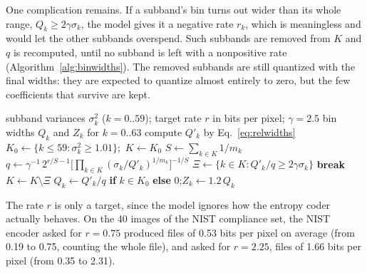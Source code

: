 One complication remains. If a subband's bin turns out wider than its whole range,
$Q_k \ge 2\gamma\sigma_k$, the model gives it a negative rate $r_k$, which is meaningless and
would let the other subbands overspend. Such subbands are removed from $K$ and $q$ is
recomputed, until no subband is left with a nonpositive rate (Algorithm~\ref{alg:binwidths}).
The removed subbands are still quantized with the final widths: they are expected to quantize
almost entirely to zero, but the few coefficients that survive are kept.

\begin{algorithm}[ht]
  \caption{Bin widths of encoder number two (Part 3, Section 3.2).}
  \label{alg:binwidths}
  \begin{algorithmic}[1]
    \Require subband variances $\sigma_k^2$ ($k = 0..59$); target rate $r$ in bits per pixel; $\gamma = 2.5$
    \Ensure bin widths $Q_k$ and $Z_k$ for $k = 0..63$
    \State compute $Q'_k$ by Eq.~\eqref{eq:relwidths}
    \State $K_0 \gets \{k \le 59 : \sigma_k^2 \ge 1.01\}$;\ $K \gets K_0$
    \Loop
      \State $S \gets \sum_{k\in K} 1/m_k$
      \State $q \gets \gamma^{-1}\, 2^{r/S - 1} \bigl[\prod_{k\in K} (\sigma_k/Q'_k)^{1/m_k}\bigr]^{-1/S}$
      \State $\Xi \gets \{k \in K : Q'_k/q \ge 2\gamma\sigma_k\}$ 
      \If{$\Xi = \emptyset$} \textbf{break} \EndIf
      \State $K \gets K \setminus \Xi$
    \EndLoop
      \State $Q_k \gets Q'_k/q$ \textbf{if} $k \in K_0$ \textbf{else} $0$;\quad $Z_k \gets 1.2\,Q_k$
    \EndFor
  \end{algorithmic}
\end{algorithm}

The rate $r$ is only a target, since the model ignores how the entropy coder actually behaves.
On the 40 images of the NIST compliance set, the NIST encoder asked for $r = 0.75$ produced
files of 0.53 bits per pixel on average (from 0.19 to 0.75, counting the whole file), and
asked for $r = 2.25$, files of 1.66 bits per pixel (from 0.35 to 2.31).
